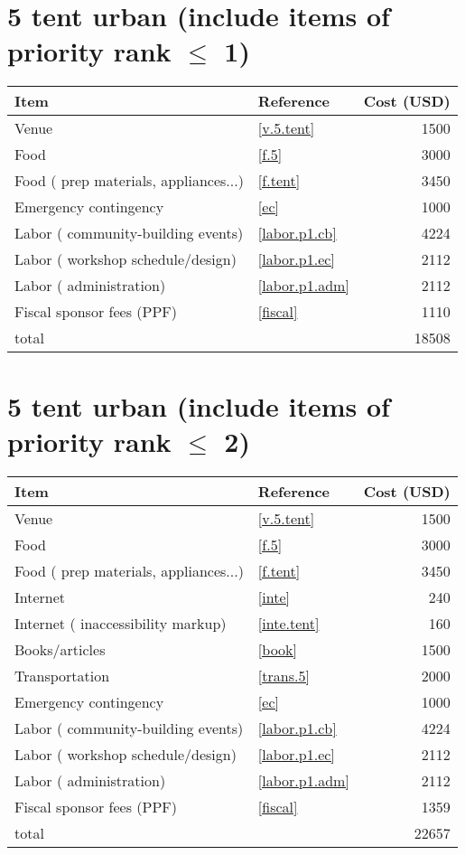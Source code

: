 \section*{5 tent urban (include items of priority rank $\leq$ 1)}
\begin{center}
\begin{tabular}{llr}
Item & Reference & Cost (USD) \\ \hline
Venue & \ref{v.5.tent} & 1500 \\
Food & \ref{f.5} & 3000 \\
Food ( prep materials, appliances...) & \ref{f.tent} & 3450 \\
Emergency contingency & \ref{ec} & 1000 \\
Labor ( community-building events) & \ref{labor.p1.cb} & 4224 \\
Labor ( workshop schedule/design) & \ref{labor.p1.ec} & 2112 \\
Labor ( administration) & \ref{labor.p1.adm} & 2112 \\
Fiscal sponsor fees (PPF) & \ref{fiscal} & 1110 \\ \hline
total &  & 18508
\end{tabular}
\end{center}
\newpage
\section*{5 tent urban (include items of priority rank $\leq$ 2)}
\begin{center}
\begin{tabular}{llr}
Item & Reference & Cost (USD) \\ \hline
Venue & \ref{v.5.tent} & 1500 \\
Food & \ref{f.5} & 3000 \\
Food ( prep materials, appliances...) & \ref{f.tent} & 3450 \\
Internet & \ref{inte} & 240 \\
Internet ( inaccessibility markup) & \ref{inte.tent} & 160 \\
Books/articles & \ref{book} & 1500 \\
Transportation & \ref{trans.5} & 2000 \\
Emergency contingency & \ref{ec} & 1000 \\
Labor ( community-building events) & \ref{labor.p1.cb} & 4224 \\
Labor ( workshop schedule/design) & \ref{labor.p1.ec} & 2112 \\
Labor ( administration) & \ref{labor.p1.adm} & 2112 \\
Fiscal sponsor fees (PPF) & \ref{fiscal} & 1359 \\ \hline
total &  & 22657
\end{tabular}
\end{center}
\newpage
